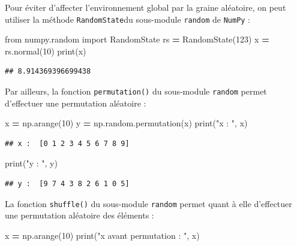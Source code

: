 \documentclass[12pt,]{book}
\newenvironment{Shaded}{\begin{snugshade}}{\end{snugshade}}
\newcommand{\DecValTok}[1]{\textcolor[rgb]{0.00,0.00,0.81}{#1}}
\newcommand{\StringTok}[1]{\textcolor[rgb]{0.31,0.60,0.02}{#1}}
\newcommand{\ImportTok}[1]{#1}
\newcommand{\OperatorTok}[1]{\textcolor[rgb]{0.81,0.36,0.00}{\textbf{#1}}}
\newcommand{\BuiltInTok}[1]{#1}
\newcommand{\NormalTok}[1]{#1}
\numberwithin{equation}{section}
\numberwithin{countremarque}{section}
\begin{document}
Pour éviter d'affecter l'environnement global par la graine aléatoire,
on peut utiliser la méthode \texttt{RandomState}du sous-module
\texttt{random} de \texttt{NumPy} :

\begin{Shaded}
\begin{Highlighting}[]
\ImportTok{from}\NormalTok{ numpy.random }\ImportTok{import}\NormalTok{ RandomState}
\NormalTok{rs }\OperatorTok{=}\NormalTok{ RandomState(}\DecValTok{123}\NormalTok{)}
\NormalTok{x }\OperatorTok{=}\NormalTok{ rs.normal(}\DecValTok{10}\NormalTok{)}
\BuiltInTok{print}\NormalTok{(x)}
\end{Highlighting}
\end{Shaded}

\begin{lstlisting}
## 8.914369396699438
\end{lstlisting}

Par ailleurs, la fonction \texttt{permutation()} du sous-module
\texttt{random} permet d'effectuer une permutation aléatoire :

\begin{Shaded}
\begin{Highlighting}[]
\NormalTok{x }\OperatorTok{=}\NormalTok{ np.arange(}\DecValTok{10}\NormalTok{)}
\NormalTok{y }\OperatorTok{=}\NormalTok{ np.random.permutation(x)}
\BuiltInTok{print}\NormalTok{(}\StringTok{"x : "}\NormalTok{, x)}
\end{Highlighting}
\end{Shaded}

\begin{lstlisting}
## x :  [0 1 2 3 4 5 6 7 8 9]
\end{lstlisting}

\begin{Shaded}
\begin{Highlighting}[]
\BuiltInTok{print}\NormalTok{(}\StringTok{"y : "}\NormalTok{, y)}
\end{Highlighting}
\end{Shaded}

\begin{lstlisting}
## y :  [9 7 4 3 8 2 6 1 0 5]
\end{lstlisting}

La fonction \texttt{shuffle()} du sous-module \texttt{random} permet
quant à elle d'effectuer une permutation aléatoire des éléments :

\begin{Shaded}
\begin{Highlighting}[]
\NormalTok{x }\OperatorTok{=}\NormalTok{ np.arange(}\DecValTok{10}\NormalTok{)}
\BuiltInTok{print}\NormalTok{(}\StringTok{"x avant permutation : "}\NormalTok{, x)}
\end{Highlighting}
\end{Shaded}
\end{document}
